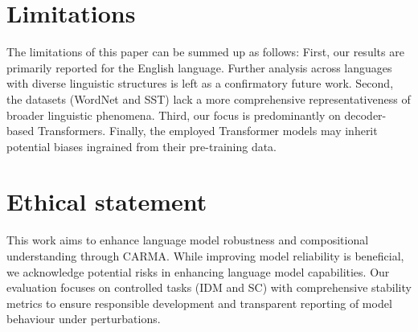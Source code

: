 \section*{Limitations}
The limitations of this paper can be summed up as follows: First, our results are primarily reported for the English language. Further analysis across languages with diverse linguistic structures is left as a confirmatory future work. Second, the datasets (WordNet and SST) lack a more comprehensive representativeness of broader linguistic phenomena. Third, our focus is predominantly on decoder-based Transformers. Finally, the employed Transformer models may inherit potential biases ingrained from their pre-training data.

\section*{Ethical statement}
This work aims to enhance language model robustness and compositional understanding through CARMA. While improving model reliability is beneficial, we acknowledge potential risks in enhancing language model capabilities. Our evaluation focuses on controlled tasks (IDM and SC) with comprehensive stability metrics to ensure responsible development and transparent reporting of model behaviour under perturbations.

